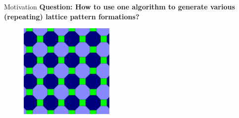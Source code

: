 \begin{frame}{Motivation}{}
  \textbf{Question: How to use one algorithm to generate
    various (repeating) lattice pattern formations?}
  \begin{figure}
    \centering
    \includegraphics[height=1.8in]{figs/tessellation2}
  \end{figure}
\end{frame}
